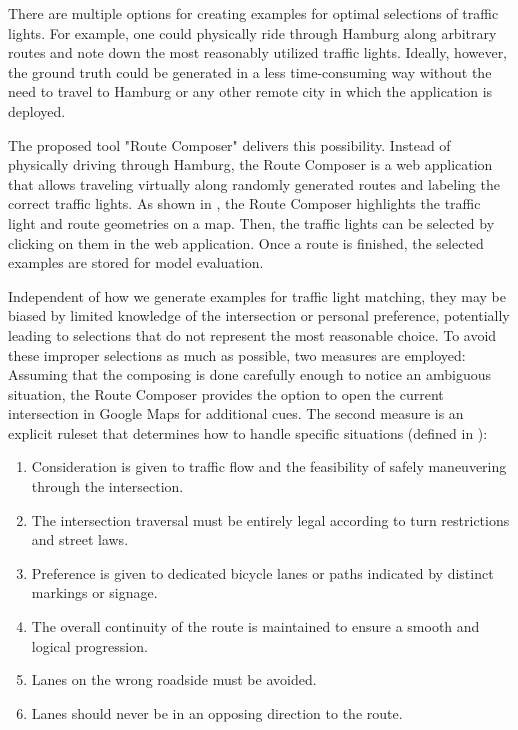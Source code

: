 There are multiple options for creating examples for optimal selections of traffic lights. For example, one could physically ride through Hamburg along arbitrary routes and note down the most reasonably utilized traffic lights. Ideally, however, the ground truth could be generated in a less time-consuming way without the need to travel to Hamburg or any other remote city in which the application is deployed. 

The proposed tool "Route Composer" delivers this possibility. Instead of physically driving through Hamburg, the Route Composer is a web application that allows traveling virtually along randomly generated routes and labeling the correct traffic lights. As shown in , the Route Composer highlights the traffic light and route geometries on a map. Then, the traffic lights can be selected by clicking on them in the web application. Once a route is finished, the selected examples are stored for model evaluation.

Independent of how we generate examples for traffic light matching, they may be biased by limited knowledge of the intersection or personal preference, potentially leading to selections that do not represent the most reasonable choice. To avoid these improper selections as much as possible, two measures are employed: Assuming that the composing is done carefully enough to notice an ambiguous situation, the Route Composer provides the option to open the current intersection in Google Maps for additional cues. The second measure is an explicit ruleset that determines how to handle specific situations (defined in \cite{matthes2023geo}):

\begin{enumerate}
\item Consideration is given to traffic flow and the feasibility of safely maneuvering through the intersection.
\item The intersection traversal must be entirely legal according to turn restrictions and street laws.
\item Preference is given to dedicated bicycle lanes or paths indicated by distinct markings or signage.
\item The overall continuity of the route is maintained to ensure a smooth and logical progression.
\item Lanes on the wrong roadside must be avoided.
\item Lanes should never be in an opposing direction to the route.
\end{enumerate}

